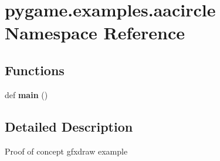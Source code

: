\hypertarget{namespacepygame_1_1examples_1_1aacircle}{}\section{pygame.\+examples.\+aacircle Namespace Reference}
\label{namespacepygame_1_1examples_1_1aacircle}
\subsection*{Functions}
\begin{DoxyCompactItemize}
\item 
\mbox{\label{namespacepygame_1_1examples_1_1aacircle_a93d6d2acf984c81e357a03e6b8fcce72}} 
def {\bfseries main} ()
\end{DoxyCompactItemize}


\subsection{Detailed Description}
\begin{DoxyVerb}Proof of concept gfxdraw example\end{DoxyVerb}
 